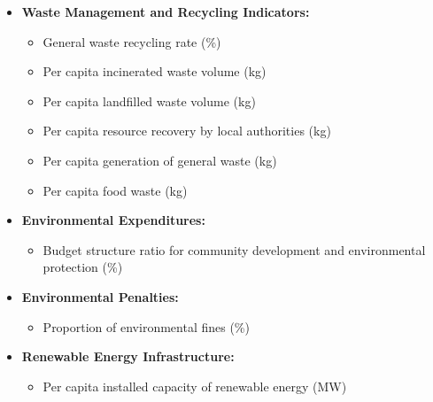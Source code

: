 \documentclass{article}
\begin{document}
\begin{itemize}
   
    \item \textbf{Waste Management and Recycling Indicators:}
    \begin{itemize}
        \item General waste recycling rate (\%)
        \item Per capita incinerated waste volume (kg)
        \item Per capita landfilled waste volume (kg)
        \item Per capita resource recovery by local authorities (kg)
        \item Per capita generation of general waste (kg)
        \item Per capita food waste (kg)
    \end{itemize}

    \item \textbf{Environmental Expenditures:}
    \begin{itemize}
        \item Budget structure ratio for community development and environmental protection (\%)
    \end{itemize}

    \item \textbf{Environmental Penalties:}
    \begin{itemize}
        \item Proportion of environmental fines (\%)
    \end{itemize}

    \item \textbf{Renewable Energy Infrastructure:}
    \begin{itemize}
        \item Per capita installed capacity of renewable energy (MW)
    \end{itemize}
    
\end{itemize}
\end{document}
